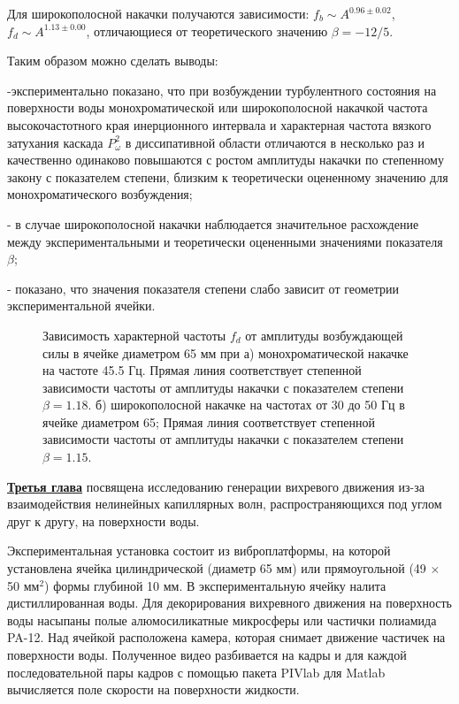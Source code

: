 Для широкополосной накачки получаются зависимости: $f_b \sim A^{0.96 \pm 0.02}$,  $f_d \sim A^{1.13 \pm 0.00}$, отличающиеся от теоретического значению $\beta = -12/5$.

Таким образом можно сделать выводы:

-экспериментально показано, что при возбуждении турбулентного состояния на поверхности воды монохроматической или широкополосной накачкой частота высокочастотного края инерционного интервала и характерная частота вязкого затухания каскада $P_\omega^2$ в диссипативной области отличаются в несколько раз и качественно одинаково повышаются с ростом амплитуды накачки по степенному закону с показателем степени, близким к теоретически оцененному значению для монохроматического возбуждения;

- в случае широкополосной накачки наблюдается значительное расхождение между экспериментальными и теоретически оцененными значениями показателя $\beta$; 

- показано, что значения показателя степени слабо зависит от геометрии экспериментальной ячейки.

\begin{figure}[ht]
 \begin{minipage}[ht]{0.49\linewidth}
 \end{minipage}
 \hfill
 \begin{minipage}[ht]{0.49\linewidth}
 \end{minipage}
 \caption{Зависимость характерной частоты $f_d$ от амплитуды возбуждающей силы в ячейке диаметром 65 мм при а) монохроматической накачке на частоте 45.5 Гц. Прямая линия соответствует степенной зависимости частоты от амплитуды накачки с показателем степени $\beta = 1.18$.
 б) широкополосной накачке на частотах от 30 до 50 Гц в ячейке диаметром 65; Прямая линия соответствует степенной зависимости частоты от амплитуды накачки с показателем степени $\beta = 1.15$.}
 \label{img:water_fd_65} 
\end{figure}


\underline{\textbf{Третья глава}} посвящена исследованию генерации вихревого движения из-за взаимодействия нелинейных капиллярных волн, распространяющихся под углом друг к другу, на поверхности воды.

Экспериментальная установка
 состоит из виброплатформы, на которой установлена ячейка цилиндрической (диаметр 65 мм) или прямоугольной (49 $\times$ 50 мм$^2$) формы глубиной 10 мм. В экспериментальную ячейку налита дистиллированная воды. Для декорирования вихревного движения на поверхность воды насыпаны полые алюмосиликатные микросферы или частички полиамида PA-12. Над ячейкой расположена камера, которая снимает движение частичек на поверхности воды. Полученное видео разбивается на кадры и для каждой последовательной пары кадров с помощью пакета PIVlab для Matlab \cite{PIVlab} вычисляется поле скорости на поверхности жидкости.

